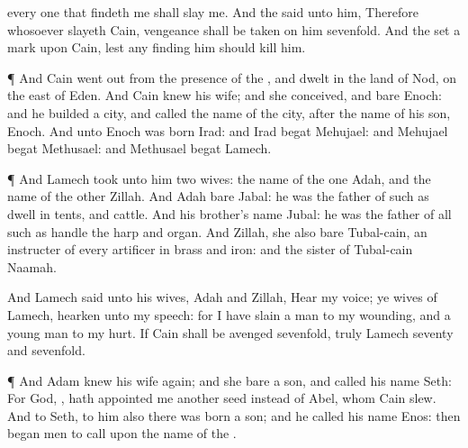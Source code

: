 {{} every one that findeth
me shall slay
me.
And the
{}
said unto him,
Therefore whosoever
slayeth
Cain, vengeance shall be
taken on him
sevenfold. And the
{}
set a
mark upon
Cain,
lest any
finding him should
kill him.
\par }{\PP {}¶ And
Cain went
out from the
presence of the
{}, and
dwelt in the
land of
Nod, on the
east of
Eden.
And
Cain
knew his
wife; and she
conceived, and
bare
Enoch: and he
builded a
city, and
called the
name of the
city, after the
name of his
son,
Enoch.
And unto
Enoch was
born
Irad: and
Irad
begat
Mehujael: and
Mehujael
begat
Methusael: and
Methusael
begat
Lamech.
\par }{\PP {}¶ And
Lamech
took unto him
two
wives: the
name of the
one
{}
Adah, and the
name of the
other
Zillah.
And
Adah
bare
Jabal: he was the
father of such as
dwell in
tents, and
{}
cattle.
And his
brother’s
name
{}
Jubal: he was the
father of all such as
handle the
harp and
organ.
And
Zillah, she also
bare
Tubal-cain, an
instructer of every
artificer in
brass and
iron: and the
sister of
Tubal-cain
{}
Naamah.
\par }{\PP {}And
Lamech
said unto his
wives,
Adah and
Zillah,
Hear my
voice; ye
wives of
Lamech,
hearken unto my
speech: for I have
slain a
man to my
wounding, and a young
man to my
hurt.
If
Cain shall be
avenged
sevenfold, truly
Lamech
seventy and
sevenfold.
\par }{\PP {}¶ And
Adam
knew his
wife
again; and she
bare a
son, and
called his
name
Seth: For
God,
{}, hath
appointed me
another
seed
instead of
Abel,
whom
Cain
slew.
And to
Seth, to
him also there was
born a
son; and he
called his
name
Enos: then began
men to
call upon the
name of the
{}.

}
